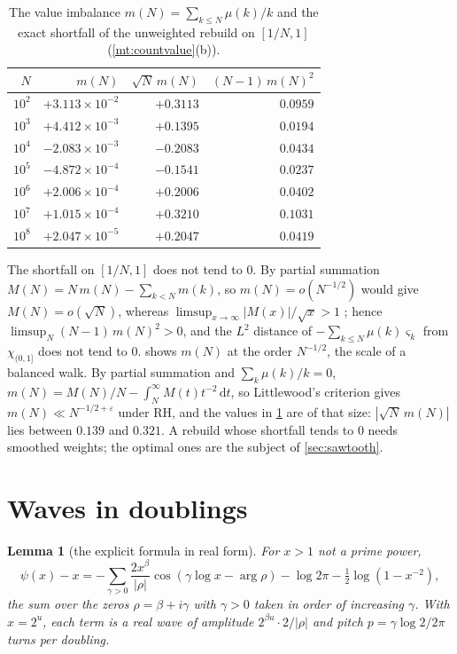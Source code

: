 \documentclass[11pt]{article}
\newtheorem{lemma}[theorem]{Lemma}
\theoremstyle{definition}\newtheorem{definition}[theorem]{Definition}
\theoremstyle{remark}\newtheorem{remark}[theorem]{Remark}
\newcommand{\dd}{\,\mathrm d}\newcommand{\e}{\mathrm e}
\begin{document}
\begin{table}[h]\centering\small
\begin{tabular}{@{}rrrr@{}}\toprule
$N$ & $m(N)$ & $\sqrt N\,m(N)$ & $(N-1)\,m(N)^2$\\\midrule
$10^2$ & $+3.113\times10^{-2}$ & $+0.3113$ & $0.0959$\\
$10^3$ & $+4.412\times10^{-3}$ & $+0.1395$ & $0.0194$\\
$10^4$ & $-2.083\times10^{-3}$ & $-0.2083$ & $0.0434$\\
$10^5$ & $-4.872\times10^{-4}$ & $-0.1541$ & $0.0237$\\
$10^6$ & $+2.006\times10^{-4}$ & $+0.2006$ & $0.0402$\\
$10^7$ & $+1.015\times10^{-4}$ & $+0.3210$ & $0.1031$\\
$10^8$ & $+2.047\times10^{-5}$ & $+0.2047$ & $0.0419$\\\bottomrule
\end{tabular}
\caption{The value imbalance $m(N)=\sum_{k\le N}\mu(k)/k$ and the exact shortfall of the unweighted rebuild on $[1/N,1]$ (\cref{mt:countvalue}(b)).}\label{tab:m}
\end{table}

The shortfall on $[1/N,1]$ does not tend to $0$. By partial summation $M(N)=N\,m(N)-\sum_{k<N}m(k)$, so $m(N)=o(N^{-1/2})$ would give $M(N)=o(\sqrt N)$, whereas $\limsup_{x\to\infty}|M(x)|/\sqrt x>1$ \cite{OdlyzkoTeRiele}; hence $\limsup_N(N-1)\,m(N)^2>0$, and the $L^2$ distance of $-\sum_{k\le N}\mu(k)\varsigma_k$ from $\chi_{(0,1]}$ does not tend to $0$.  shows $m(N)$ at the order $N^{-1/2}$, the scale of a balanced walk. By partial summation and $\sum_k\mu(k)/k=0$, $m(N)=M(N)/N-\int_N^\infty M(t)t^{-2}\dd t$, so Littlewood's criterion gives $m(N)\ll N^{-1/2+\varepsilon}$ under RH, and the values in \cref{tab:m} are of that size: $|\sqrt N\,m(N)|$ lies between $0.139$ and $0.321$. A rebuild whose shortfall tends to $0$ needs smoothed weights; the optimal ones are the subject of \cref{sec:sawtooth}.

\section{Waves in doublings}\label{sec:waves}

\begin{lemma}[the explicit formula in real form]\label{lem:real}
For $x>1$ not a prime power,
\[
\psi(x)-x=-\sum_{\gamma>0}\frac{2x^\beta}{|\rho|}\cos(\gamma\log x-\arg\rho)-\log2\pi-\tfrac12\log(1-x^{-2}),
\]
the sum over the zeros $\rho=\beta+i\gamma$ with $\gamma>0$ taken in order of increasing $\gamma$. With $x=2^u$, each term is a real wave of amplitude $2^{\beta u}\cdot2/|\rho|$ and pitch $p=\gamma\log2/2\pi$ turns per doubling.
\end{lemma}
\end{document}
